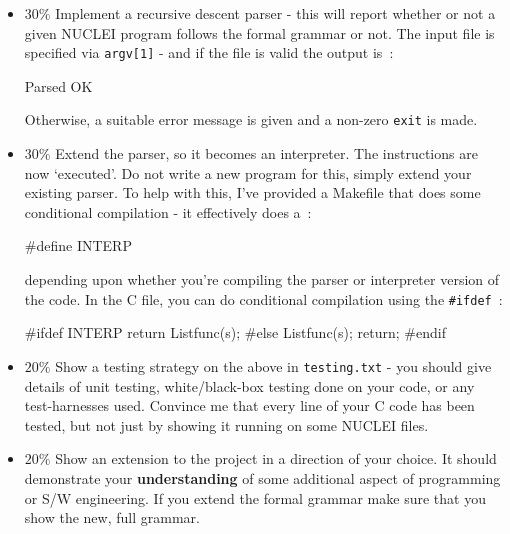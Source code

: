 \begin{exercise}
\begin{itemize}
\item {\bf $30\%$}
Implement a recursive descent parser - this will report
whether or not a given NUCLEI program follows the formal grammar or not.
The input file is specified via \verb^argv[1]^ - and if the file is valid the output is~:
\begin{terminaloutput}
Parsed OK
\end{terminaloutput}
Otherwise, a suitable error message is given and a non-zero \verb^exit^ is made.

\item {\bf $30\%$}
Extend the parser, so it becomes an interpreter. The instructions are
now `executed'. Do not write a new program for this, simply extend your
existing parser. To help with this, I've provided a Makefile that does
some conditional compilation - it effectively does a~:
\begin{codesnippet}
#define INTERP 
\end{codesnippet}
depending upon whether you're compiling the parser or interpreter version of the code.
In the C file, you can do conditional compilation using the \verb^#ifdef^~:
\begin{codesnippet}
#ifdef INTERP
      return Listfunc(s);
#else
      Listfunc(s);
      return;
#endif
\end{codesnippet}

\item {\bf $20\%$}
Show a testing strategy on the above in \verb^testing.txt^ - you should
give details of unit testing, white/black-box testing done on your code,
or any test-harnesses used.  Convince me that every line of your C code
has been tested, but not just by showing it running on some NUCLEI files.

\item {\bf $20\%$}
Show an extension to the project in a direction of your choice. It should
demonstrate your {\bf understanding} of some additional aspect of programming or
S/W engineering. If you extend the formal grammar make sure that you
show the new, full grammar.

\end{itemize}



\end{exercise}
